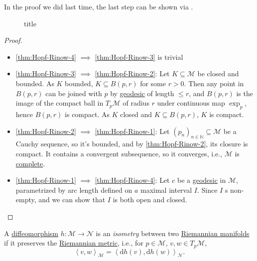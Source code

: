 In the proof we did last time, the last step can be shown via \cite*[Corollary 3.9]{flaherty2013riemannian}.
\begin{eg}
	\begin{figure}[H]
		\centering
		\caption{title}
		\label{fig:Hopf-Rinow-uniqueness}
	\end{figure}
\end{eg}

\begin{proof}
	\begin{itemize}
		\item \autoref{thm:Hopf-Rinow-4} \(\implies \) \autoref{thm:Hopf-Rinow-3} is trivial
		\item \autoref{thm:Hopf-Rinow-3} \(\implies \) \autoref{thm:Hopf-Rinow-2}: Let \(K \subseteq \mathcal{M} \) be closed and bounded. As \(K\) bounded, \(K \subseteq B(p, r)\) for some \(r > 0\). Then any point in \(B(p, r)\) can be joined with \(p\) by \hyperref[def:geodesic]{geodesic} of length \(\leq r\), and \(B(p, r)\) is the image of the compact ball in \(T_p \mathcal{M} \) of radius \(r\) under continuous map \(\exp _p\), hence \(B(p, r)\) is compact. As \(K\) closed and \(K \subseteq B(p, r)\), \(K\) is compact.
		\item \autoref{thm:Hopf-Rinow-2} \(\implies \) \autoref{thm:Hopf-Rinow-1}: Let \((p_n)_{n \in \mathbb{N} } \subseteq \mathcal{M} \) be a Cauchy sequence, so it's bounded, and by \autoref{thm:Hopf-Rinow-2}, its closure is compact. It contains a convergent subsequence, so it converges, i.e., \(\mathcal{M} \) is \hyperref[def:geodesically-complete]{complete}.
		\item \autoref{thm:Hopf-Rinow-1} \(\implies \) \autoref{thm:Hopf-Rinow-4}: Let \(c\) be a \hyperref[def:geodesic]{geodesic} in \(\mathcal{M} \), parametrized by arc length defined on \(a\) maximal interval \(I\). Since \(I\) s non-empty, and we can show that \(I\) is both open and closed.
	\end{itemize}
\end{proof}

\begin{definition}[Isometry]\label{def:isometry}
	A \hyperref[def:diffeomorphism]{diffeomorphism} \(h\colon \mathcal{M} \to \mathcal{N} \) is an \emph{isometry} between two \hyperref[def:Riemannian-manifold]{Riemannian manifolds} if it preserves the \hyperref[def:Riemannian-metric]{Riemannian metric}, i.e., for \(p\in \mathcal{M} \), \(v, w\in T_p \mathcal{M} \),
	\[
		\left\langle v, w \right\rangle _{\mathcal{M} } = \left\langle \mathrm{d} h(v), \mathrm{d} h(w) \right\rangle _{\mathcal{N} }.
	\]
\end{definition}

